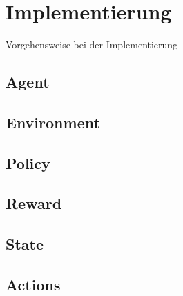 \chapter{Implementierung}%

\label{cha:Implementierung}

Vorgehensweise bei der Implementierung


\section{Agent}

\section{Environment}

\section{Policy}

\section{Reward}

\section{State}

\section{Actions}

